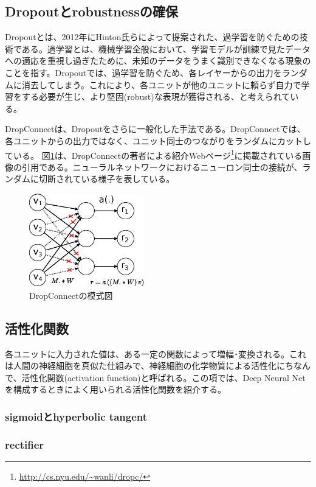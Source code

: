 \subsection{Dropoutとrobustnessの確保}
Dropoutとは、2012年にHinton氏らによって提案された、過学習を防ぐための技術である\cite{hinton2012improving}。過学習とは、機械学習全般において、学習モデルが訓練で見たデータへの適応を重視し過ぎたために、未知のデータをうまく識別できなくなる現象のことを指す。Dropoutでは、過学習を防ぐため、各レイヤーからの出力をランダムに消去してしまう。これにより、各ユニットが他のユニットに頼らず自力で学習をする必要が生じ、より堅固(robust)な表現が獲得される、と考えられている。\par
DropConnectは、Dropoutをさらに一般化した手法である。DropConnectでは、各ユニットからの出力ではなく、ユニット同士のつながりをランダムにカットしている。
図\ref{c3_dropconnect}は、DropConnectの著者による紹介Webページ\footnote{\url{http://cs.nyu.edu/~wanli/dropc/}}に掲載されている画像の引用である。ニューラルネットワークにおけるニューロン同士の接続が、ランダムに切断されている様子を表している。
\begin{figure}[tbp]
 \begin{center}
  \includegraphics[width=50mm]{img/c3/nn_dc}
 \end{center}
 \caption{DropConnectの模式図}
 \label{c3_dropconnect}
\end{figure}
\subsection{活性化関数}
各ユニットに入力された値は、ある一定の関数によって増幅･変換される。これは人間の神経細胞を真似た仕組みで、神経細胞の化学物質による活性化にちなんで、活性化関数(activation function)と呼ばれる。この項では、Deep Neural Netを構成するときによく用いられる活性化関数を紹介する。
\subsubsection{sigmoidとhyperbolic tangent}
\subsubsection{rectifier}

